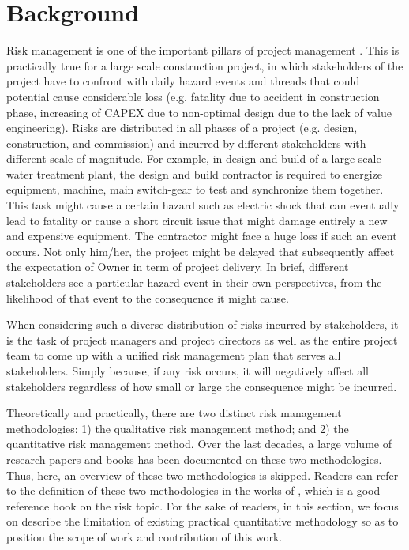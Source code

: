 \documentclass[10pt,halfline,a4paper]{ouparticle}
\begin{document}
\section{Background}
\label{sec2}
Risk management is one of the important pillars of project management \citep{PMI2003}. This is practically true for a large scale construction project, in which stakeholders of the project have to confront with daily hazard events and threads that could potential cause considerable loss (e.g. fatality due to accident in construction phase, increasing of CAPEX due to non-optimal design due to the lack of value engineering). Risks are distributed in all phases of a project (e.g. design, construction, and commission) and incurred by different stakeholders with different scale of magnitude. For example, in design and build of a large scale water treatment plant, the design and build contractor is required to energize equipment, machine, main switch-gear to test and synchronize them together. This task might cause a certain hazard such as electric shock that can eventually lead to fatality or cause a short circuit issue that might damage entirely a new and expensive equipment. The contractor might face a huge loss if such an event occurs. Not only him/her, the project might be delayed that subsequently affect the expectation of Owner in term of project delivery. In brief, different stakeholders see a particular hazard event in their own perspectives, from the likelihood of that event to the consequence it might cause. 

When considering such a diverse distribution of risks incurred by stakeholders, it is the task of project managers and project directors as well as the entire project team to come up with a unified risk management plan that serves all stakeholders. Simply because, if any risk occurs, it will negatively affect all stakeholders regardless of how small or large the consequence might be incurred. 

Theoretically and practically, there are two distinct risk management methodologies: 1) the qualitative risk management method; and 2) the quantitative risk management method. Over the last decades, a large volume of research papers and books has been documented on these two methodologies. Thus, here, an overview of these two methodologies is skipped. Readers can refer to the definition of these two methodologies in the works of \citep{McNeil2011}, which is a good reference book on the risk topic. For the sake of readers, in this section, we focus on describe the limitation of existing practical quantitative methodology so as to position the scope of work and contribution of this work. 
\end{document}
